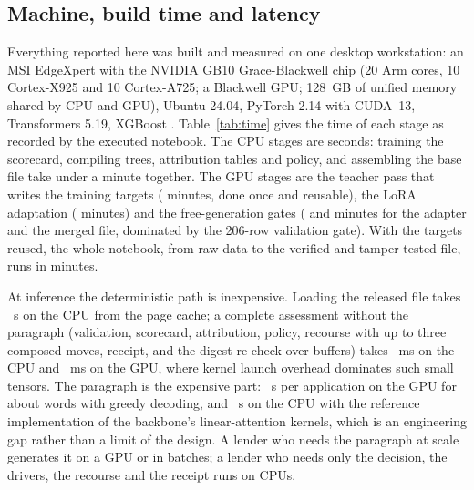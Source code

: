 \documentclass[twocolumn,10pt]{article}
\begin{document}
\subsection{Machine, build time and latency}

Everything reported here was built and measured on one desktop workstation: an MSI EdgeXpert with the NVIDIA GB10
Grace-Blackwell chip (20 Arm cores, 10 Cortex-X925 and 10 Cortex-A725; a Blackwell GPU; 128~GB of unified memory shared
by CPU and GPU), Ubuntu 24.04, PyTorch 2.14 with CUDA~13, Transformers 5.19, XGBoost \nXGBVersion{}. Table~\ref{tab:time}
gives the time of each stage as recorded by the executed notebook. The CPU stages are seconds: training the scorecard,
compiling trees, attribution tables and policy, and assembling the base file take under a minute together. The GPU stages
are the teacher pass that writes the training targets (\nTimeTeacherMin{} minutes, done once and reusable), the LoRA
adaptation (\nTimeLoraMin{} minutes) and the free-generation gates (\nTimeAdapterGatesMin{} and \nTimeMergedGatesMin{}
minutes for the adapter and the merged file, dominated by the 206-row validation gate). With the targets reused, the whole
notebook, from raw data to the verified and tamper-tested file, runs in \nTimeNotebookMin{} minutes.

At inference the deterministic path is inexpensive. Loading the released file takes \nLoadCPUS{}~s on the CPU from the page
cache; a complete assessment without the paragraph (validation, scorecard, attribution, policy, recourse with up to three
composed moves, receipt, and the digest re-check over \nCompiledTensors{} buffers) takes \nScoreCPUMs{}~ms on the CPU
and \nScoreGPUMs{}~ms on the GPU, where kernel launch overhead dominates such small tensors. The paragraph is the expensive
part: \nFullGPUS{}~s per application on the GPU for about \nParagraphWords{} words with greedy decoding, and
\nFullCPUS{}~s on the CPU with the reference implementation of the backbone's linear-attention kernels, which is an
engineering gap rather than a limit of the design. A lender who needs the paragraph at scale generates it on a GPU or in
batches; a lender who needs only the decision, the drivers, the recourse and the receipt runs on CPUs.
\end{document}
